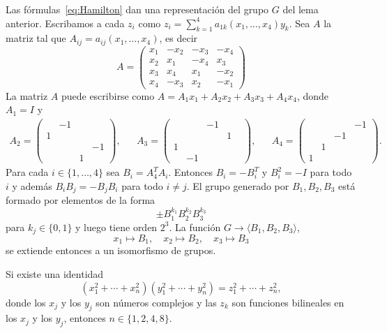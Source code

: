 \begin{example}
	Las fórmulas~\eqref{eq:Hamilton} dan una representación del grupo $G$ del
	lema anterior. Escribamos a cada $z_i$ como
	$z_i=\sum_{k=1}^4a_{1k}(x_1,\dots,x_4)y_k$. Sea $A$ la matriz tal que
	$A_{ij}=a_{ij}(x_1,\dots,x_4)$, es decir
	\[
		A=\begin{pmatrix}
			x_1 & -x_2 & -x_3 & -x_4\\
			x_2 & x_1 & -x_4 & x_3\\
			x_3 & x_4 & x_1 & -x_2\\
			x_4 & -x_3 & x_2 & -x_1
		\end{pmatrix}
	\]
	La matriz $A$ puede escribirse como $A=A_1x_1+A_2x_2+A_3x_3+A_4x_4$, donde $A_1=I$ y 
	\begin{align*}
		A_2=\begin{pmatrix}
			& -1\\
			1 \\
			&&&-1\\
			&&1
		\end{pmatrix},
		&&
		A_3=\begin{pmatrix}
			&& -1 \\
			&&&1 & \\
			1\\
			&-1
		  \end{pmatrix},
		  &&
		  A_4=\begin{pmatrix}
			&&&-1\\
			&&-1\\
			&1\\
			1
		\end{pmatrix}.
	\end{align*}
	Para cada $i\in\{1,\dots,4\}$ sea $B_i=A_4^TA_i$. Entonces $B_i=-B_i^T$ y $B_i^2=-I$ 
	para todo $i$ y además $B_iB_j=-B_jB_i$ para todo $i\ne j$. 
	El grupo generado por $B_1,B_2,B_3$ está formado por elementos de la forma
	\[
		\pm B_1^{k_1}B_2^{k_2}B_3^{k_3}
	\]
	para $k_j\in\{0,1\}$ y luego tiene orden $2^3$. 
	La función 
	$G\to\langle B_1,B_2,B_3\rangle$,
	\[
		x_1\mapsto B_1,\quad
		x_2\mapsto B_2,\quad
		x_3\mapsto B_3 
	\]
	se extiende entonces a un isomorfismo de grupos.
\end{example}

\begin{theorem}[Hurwitz]
	Si existe una identidad 
	\begin{equation}
		\label{eq:Hurwitz}
		(x_1^2+\cdots+x_n^2)(y_1^2+\cdots+y_n^2)=z_1^2+\cdots+z_n^2,
	\end{equation}
	donde los $x_j$ y los $y_j$ son números complejos y las $z_k$ son funciones
	bilineales en los $x_j$ y los $y_j$, entonces $n\in\{1,2,4,8\}$.
\end{theorem}

